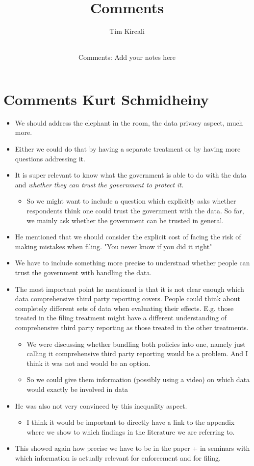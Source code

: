 \documentclass{article}
\title{Comments}
\author{Tim Kircali}
\date{\\ \small Comments: Add your notes here}
\begin{document}
\maketitle

\section{Comments Kurt Schmidheiny}
\begin{itemize}
    \item We should address the elephant in the room, the data privacy aspect, much more. 
    \item Either we could do that by having a separate treatment or by having more questions addressing it. 
    \item It is super relevant to know what the government is able to do with the data and \textit{whether they can trust the government to protect it.}
    \begin{itemize}
        \item So we might want to include a question which explicitly asks whether respondents think one could trust the government with the data. So far, we mainly ask whether the government can be trusted in general.
    \end{itemize}
    \item He mentioned that we should consider the explicit cost of facing the risk of making mistakes when filing. "You never know if you did it right"
    \item We have to include something more precise to understnad whether people can trust the government with handling the data. 
    \item The most important point he mentioned is that it is not clear enough which data comprehensive third party reporting covers. People could think about completely different sets of data when evaluating their effects. E.g. those treated in the filing treatment might have a different understanding of comprehensive third party reporting as those treated in the other treatments. 
    \begin{itemize}
        \item We were discussing whether bundling both policies into one, namely just calling it comprehensive third party reporting would be a problem. And I think it was not and would be an option. 
        \item So we could give them information (possibly using a video) on which data would exactly be involved in data
    \end{itemize}
    \item He was also not very convinced by this inequality aspect.
    \begin{itemize}
        \item I think it would be important to directly have a link to the appendix where we show to which findings in the literature we are referring to.
    \end{itemize}
    \item This showed again how precise we have to be in the paper + in seminars with which information is actually relevant for enforcement and for filing. 
\end{itemize}
\end{document}
